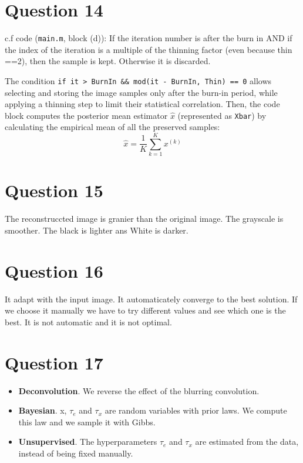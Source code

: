 \documentclass[11pt,a4paper]{article}
\begin{document}
\section*{Question 14}
c.f code (\texttt{main.m}, block (d)):
If the iteration number is after the burn in AND if the index of the iteration is a multiple of the thinning factor (even because thin ==2), then the sample is kept. Otherwise it is discarded.


The condition \texttt{if it > BurnIn \&\& mod(it - BurnIn, Thin) == 0} allows selecting and storing the image samples only after the burn-in period, while applying a thinning step to limit their statistical correlation. Then, the code block computes the posterior mean estimator $\hat{x}$ (represented as \texttt{Xbar}) by calculating the empirical mean of all the preserved samples:   
\[
\hat{x} = \frac{1}{K} \sum_{k=1}^{K} x^{(k)}
\]


\section*{Question 15}

The reconstruccted image is granier than the original image. The grayscale is smoother. The black is lighter ans White is darker. 

\section*{Question 16}

It adapt with the input image. It automaticately converge to the best solution.
If we choose it manually we have to try different values and see which one is the best. It is not automatic and it is not optimal.

\section*{Question 17}

\begin{itemize}
  \item \textbf{Deconvolution}. We reverse the effect of the blurring convolution.
  \item \textbf{Bayesian}. x, $\tau_e$ and $\tau_x$ are random variables with prior laws. We compute this law and we sample it with Gibbs.
  \item \textbf{Unsupervised}. The hyperparameters $\tau_e$ and $\tau_x$ are estimated from the data, instead of being fixed manually.
\end{itemize}
\end{document}
